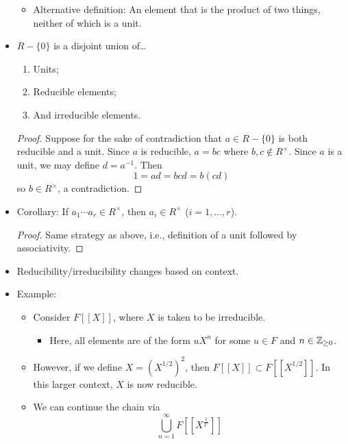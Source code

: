 \documentclass[../notes.tex]{subfiles}
\begin{document}
\begin{itemize}
\begin{itemize}
        \item Alternative definition: An element that is the product of two things, neither of which is a unit.
    \end{itemize}
    \item $R-\{0\}$ is a disjoint union of\dots
    \begin{enumerate}[label={(\roman*)}]
        \item Units;
        \item Reducible elements;
        \item And irreducible elements.
    \end{enumerate}
    \begin{proof}
        Suppose for the sake of contradiction that $a\in R-\{0\}$ is both reducible and a unit. Since $a$ is reducible, $a=bc$ where $b,c\notin R^\times$. Since $a$ is a unit, we may define $d=a^{-1}$. Then
        \begin{equation*}
            1 = ad
            = bcd
            = b(cd)
        \end{equation*}
        so $b\in R^\times$, a contradiction.
    \end{proof}
    \item Corollary: If $a_1\cdots a_r\in R^\times$, then $a_i\in R^\times$ ($i=1,\dots,r$).
    \begin{proof}
        Same strategy as above, i.e., definition of a unit followed by associativity.
    \end{proof}
    \item Reducibility/irreducibility changes based on context.
    \item Example:
    \begin{itemize}
        \item Consider $F[[X]]$, where $X$ is taken to be irreducible.
        \begin{itemize}
            \item Here, all elements are of the form $uX^n$ for some $u\in F$ and $n\in{\mathbb{Z}_{\geq 0}}$.
        \end{itemize}
        \item However, if we define $X=(X^{1/2})^2$, then $F[[X]]\subset F[[X^{1/2}]]$. In this larger context, $X$ is now reducible.
        \item We can continue the chain via
        \begin{equation*}
            \bigcup_{n=1}^\infty F[[X^{\frac{1}{2^n}}]]
        \end{equation*}
    \end{itemize}

\end{itemize}
\end{document}
